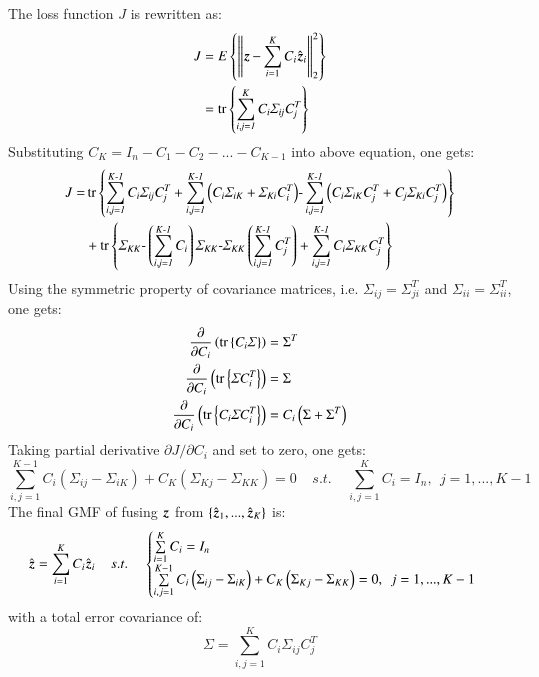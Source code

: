 The loss function $ J $ is rewritten as:
\begin{align}
	J &= E\left\lbrace \left\|  \operatorname{\boldsymbol{z}}-\sum\limits_{i=1}^{K}{C_i\hat{\operatorname{\boldsymbol{z}}}_i} \right\| ^2_2 \right\rbrace \\
	&= \operatorname{tr \left\lbrace \mathit{\sum\limits_{i,j=1}^{K}{C_i\Sigma_{ij}C_j^T}} \right\rbrace }
\end{align}
Substituting $ C_K=I_n-C_1-C_2-...-C_{K-1} $ into above equation, one gets:
\begin{equation}
\begin{aligned}
J= & \operatorname{tr \left\lbrace \mathit{\sum\limits_{i,j=1}^{K-1}{C_i\Sigma_{ij}C_j^T}+\sum\limits_{i,j=1}^{K-1}{\left(C_i\Sigma_{iK}+\Sigma_{Ki}C_i^T\right)}-\sum\limits_{i,j=1}^{K-1}{\left(C_i\Sigma_{iK}C_j^T+C_j\Sigma_{Ki}C_j^T\right)}} \right\rbrace } \\
& +\operatorname{tr \left\lbrace \mathit{\Sigma_{KK}-\left(\sum\limits_{i,j=1}^{K-1}{C_i}\right)\Sigma_{KK}-\Sigma_{KK}\left(\sum\limits_{i,j=1}^{K-1}{C_j^T}\right)+\sum\limits_{i,j=1}^{K-1}{C_i\Sigma_{KK}C_j^T}} \right\rbrace }
\end{aligned}
\end{equation}
Using the symmetric property of covariance matrices, i.e. $ \Sigma_{ij}=\Sigma_{ji}^T $ and $ \Sigma_{ii}=\Sigma_{ii}^T $, one gets:
\begin{align}
	\frac{\partial}{\partial C_i} \left(\operatorname{tr \left\lbrace \mathit{C_i\Sigma} \right\rbrace } \right) &= \Sigma^T \\
	\frac{\partial}{\partial C_i} \left(\operatorname{tr \left\lbrace \mathit{\Sigma C_i^T} \right\rbrace } \right) &= \Sigma \\
	\frac{\partial}{\partial C_i} \left(\operatorname{tr \left\lbrace \mathit{C_i \Sigma C_i^T} \right\rbrace } \right) &= C_i \left(\Sigma+\Sigma^T \right)
\end{align}
Taking partial derivative $ \partial J / \partial C_i $ and set to zero, one gets:
\begin{equation}
	\sum\limits_{i,j=1}^{K-1}{C_i} \left(\Sigma_{ij}-\Sigma_{iK}\right)+C_K\left(\Sigma_{Kj}-\Sigma_{KK}\right) = 0 \:\:\:\:\: s.t. \:\:\:\:\: \sum\limits_{i,j=1}^{K}{C_i}=I_n, \:\: j=1,...,K-1
\end{equation}
The final GMF of fusing $ \operatorname{\boldsymbol{z}} $ from $ \left\lbrace \hat{\operatorname{\boldsymbol{z}}}_1,...,\hat{\operatorname{\boldsymbol{z}}}_K \right\rbrace  $ is: 
\begin{equation}
\hat{\operatorname{\boldsymbol{z}}}=\sum\limits_{i=1}^{K}{C_i\hat{\operatorname{\boldsymbol{z}}}_i} \:\:\:\:\: s.t. \:\:\:\:\: \begin{cases}
\sum\limits_{i=1}^{K}{C_i}=I_n\\
\sum\limits_{i,j=1}^{K-1}{C_i} \left(\Sigma_{ij}-\Sigma_{iK}\right)+C_K\left(\Sigma_{Kj}-\Sigma_{KK}\right) = 0, \:\: j=1,...,K-1
\end{cases}
\end{equation} 
with a total error covariance of:
\begin{equation}
\Sigma=\sum\limits_{i,j=1}^{K}{C_i\Sigma_{ij}C_j^T}
\end{equation}

